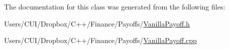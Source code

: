 The documentation for this class was generated from the following files\+:\begin{DoxyCompactItemize}
\item 
Users/\+C\+U\+I/\+Dropbox/\+C++/\+Finance/\+Payoffs/\hyperlink{_vanilla_payoff_8h}{Vanilla\+Payoff.\+h}\item 
Users/\+C\+U\+I/\+Dropbox/\+C++/\+Finance/\+Payoffs/\hyperlink{_vanilla_payoff_8cpp}{Vanilla\+Payoff.\+cpp}\end{DoxyCompactItemize}
